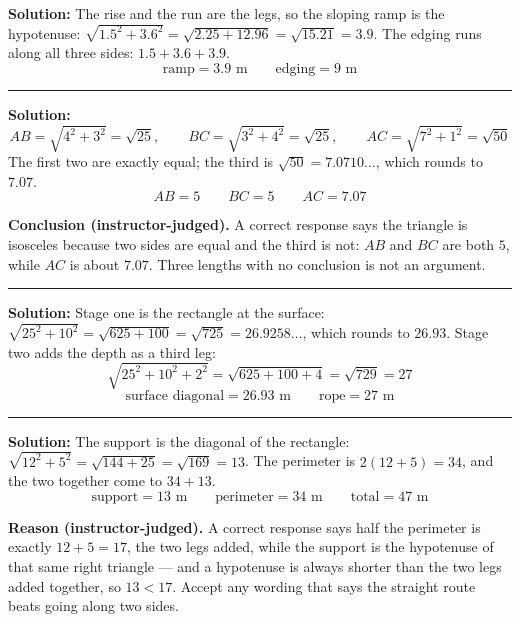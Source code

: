 \documentclass[12pt]{article}
\begin{document}
\textbf{Solution:} \quad The rise and the run are the legs, so the sloping ramp is the
hypotenuse: $\sqrt{1.5^2 + 3.6^2} = \sqrt{2.25 + 12.96} = \sqrt{15.21} = 3.9$. The edging runs
along all three sides: $1.5 + 3.6 + 3.9$.
\[ \boxed{\text{ramp} = 3.9 \text{ m} \qquad \text{edging} = 9 \text{ m}} \]

\vspace{0.2cm}

\noindent\rule{\linewidth}{0.2pt}


\textbf{Solution:} \quad
\[ AB = \sqrt{4^2 + 3^2} = \sqrt{25}, \qquad BC = \sqrt{3^2 + 4^2} = \sqrt{25}, \qquad
   AC = \sqrt{7^2 + 1^2} = \sqrt{50} \]
The first two are exactly equal; the third is $\sqrt{50} = 7.0710\ldots$, which rounds to $7.07$.
\[ \boxed{AB = 5 \qquad BC = 5 \qquad AC = 7.07} \]

\textbf{Conclusion (instructor-judged).} A correct response says the triangle is isosceles
because two sides are equal and the third is not: $AB$ and $BC$ are both $5$, while $AC$ is about
$7.07$. Three lengths with no conclusion is not an argument.

\vspace{0.2cm}

\noindent\rule{\linewidth}{0.2pt}


\textbf{Solution:} \quad Stage one is the rectangle at the surface:
$\sqrt{25^2 + 10^2} = \sqrt{625 + 100} = \sqrt{725} = 26.9258\ldots$, which rounds to $26.93$.
Stage two adds the depth as a third leg:
\[ \sqrt{25^2 + 10^2 + 2^2} = \sqrt{625 + 100 + 4} = \sqrt{729} = 27 \]
\[ \boxed{\text{surface diagonal} = 26.93 \text{ m} \qquad \text{rope} = 27 \text{ m}} \]

\vspace{0.2cm}

\noindent\rule{\linewidth}{0.2pt}


\textbf{Solution:} \quad The support is the diagonal of the rectangle:
$\sqrt{12^2 + 5^2} = \sqrt{144 + 25} = \sqrt{169} = 13$. The perimeter is
$2(12 + 5) = 34$, and the two together come to $34 + 13$.
\[ \boxed{\text{support} = 13 \text{ m} \qquad \text{perimeter} = 34 \text{ m} \qquad
   \text{total} = 47 \text{ m}} \]

\textbf{Reason (instructor-judged).} A correct response says half the perimeter is exactly
$12 + 5 = 17$, the two legs added, while the support is the hypotenuse of that same right
triangle --- and a hypotenuse is always shorter than the two legs added together, so $13 < 17$.
Accept any wording that says the straight route beats going along two sides.
\end{document}
